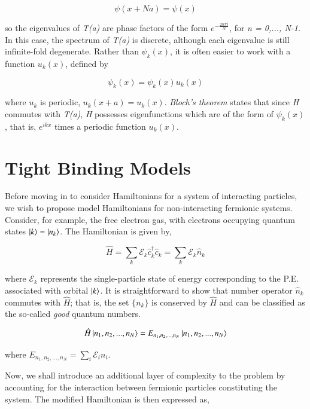 \documentclass{resonance}
\begin{document}
\begin{equation}
    \psi(x+Na) = \psi(x)
\end{equation}

so the eigenvalues of \textit{T(a)} are phase factors of the form $e^{-\frac{2n\pi i}{N}}$, for \textit{n = 0,..., N-1}. In this case, the spectrum of \textit{T(a)} is discrete, although each eigenvalue is still infinite-fold degenerate. Rather than $\psi_{k}(x)$, it is often easier to work with a function $u_{k}(x)$, defined by

\begin{equation}
    \psi_{k}(x) = \psi_{k}(x) u_{k}(x)
\end{equation}

where $u_{k}$ is periodic, $u_{k}(x+a) = u_{k}(x)$. \textit{Bloch's theorem} states that since \textit{H} commutes with \textit{T(a)}, \textit{H} possesses eigenfunctions which are of the form of $\psi_{k}(x)$, that is, $e^{ikx}$ times a periodic function $u_{k}(x)$. 


\section{Tight Binding Models}

Before moving in to consider Hamiltonians for a system of interacting particles, we wish to propose model Hamiltonians for non-interacting fermionic systems. Consider, for example, the free electron gas, with electrons occupying quantum states $\ket{k} = \ket{n_{k}}$. The Hamiltonian is given by,

\begin{equation}
    \hat{H} = \sum_{k}\mathcal{E}_{k} \hat{c}^{\dagger}_{k} \hat{c}_{k} = \sum_{k}\mathcal{E}_{k} \hat{n}_{k}
\end{equation}

where $\mathcal{E}_{k}$ represents the single-particle state of energy corresponding to the P.E. associated with orbital $\ket{k}$. It is straightforward to show that number operator $\hat{n}_{k}$ commutes with $\hat{H}$; that is, the set $\{n_{k}\}$ is conserved by $\hat{H}$ and can be classified as the so-called \textit{good} quantum numbers. \par

\begin{equation}
    \hat{H}\ket{n_{1}, n_{2},..., n_{N}} = E_{n_{1}, n_{2},..., n_{N}}\ket{n_{1}, n_{2},..., n_{N}}
\end{equation}

where $E_{n_{1}, n_{2},..., n_{N}} = \sum_{i}\mathcal{E}_{i} n_{i}$. \par
Now, we shall introduce an additional layer of complexity to the problem by accounting for the interaction between fermionic particles constituting the system. The modified Hamiltonian is then expressed as,
\end{document}
